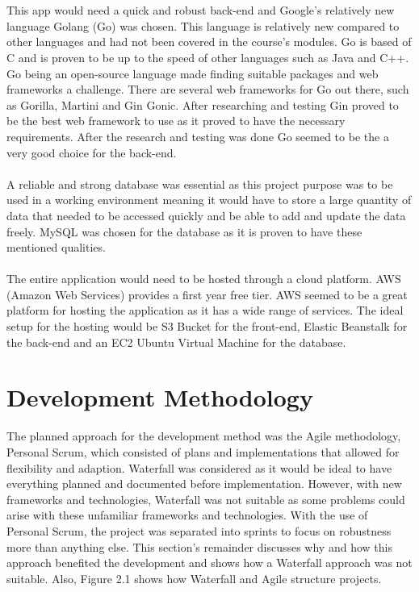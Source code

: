 \\\\ This app would need a quick and robust back-end and Google's relatively new language Golang (Go) was chosen. This language is relatively new compared to other languages and had not been covered in the course's modules. Go is based of C and is proven to be up to the speed of other languages such as Java and C++. Go being an open-source language made finding suitable packages and web frameworks a challenge. There are several web frameworks for Go out there, such as Gorilla, Martini and Gin Gonic. After researching and testing Gin proved to be the best web framework to use as it proved to have the necessary requirements. After the research and testing was done Go seemed to be the a very good choice for the back-end.
\\\\ A reliable and strong database was essential as this project purpose was to be used in a working environment meaning it would have to store a large quantity of data that needed to be accessed quickly and be able to add and update the data freely. MySQL was chosen for the database as it is proven to have these mentioned qualities. 
\\\\ The entire application would need to be hosted through a cloud platform. AWS (Amazon Web Services) provides a first year free tier. AWS seemed to be a great platform for hosting the application as it has a wide range of services. The ideal setup for the hosting would be S3 Bucket for the front-end, Elastic Beanstalk for the back-end and an EC2 Ubuntu Virtual Machine for the database.

\section{Development Methodology}
The planned approach for the development method was the Agile methodology, Personal Scrum, which consisted of plans and implementations that allowed for flexibility and adaption. Waterfall was considered as it would be ideal to have everything planned and documented before implementation. However, with new frameworks and technologies, Waterfall was not suitable as some problems could arise with these unfamiliar frameworks and technologies. With the use of Personal Scrum, the project was separated into sprints to focus on robustness more than anything else. This section's remainder discusses why and how this approach benefited the development and shows how a Waterfall approach was not suitable. Also, Figure 2.1 shows how Waterfall and Agile structure projects.

